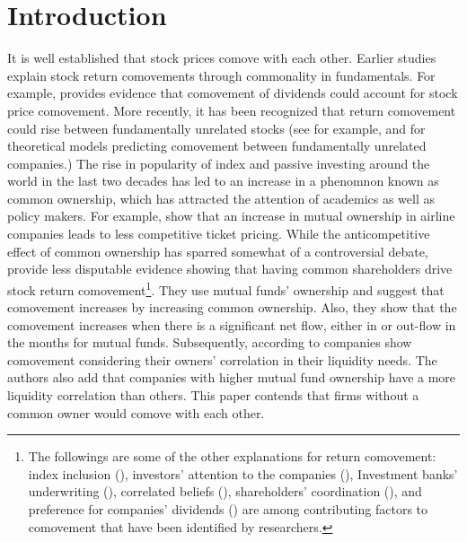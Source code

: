 \section{Introduction}

It is well established that stock prices comove with each other. Earlier studies explain stock return comovements through commonality in fundamentals. For example, \cite{shiller1989comovements} provides evidence that comovement of dividends could account for stock price comovement. More recently, it has been recognized that return comovement could rise between fundamentally unrelated stocks (see for example, {\cite{barberis2003style} and \cite{barberis2005comovement}} for theoretical models predicting comovement between fundamentally unrelated companies.) The rise in popularity of index and passive investing around the world in the last two decades has led to an increase in a phenomnon known as common ownership, which has attracted the attention of academics as well as policy makers. For example, \cite{azar2018anticompetitive} show that an increase in mutual ownership in airline companies leads to less competitive ticket pricing.  While the anticompetitive effect of common ownership has sparred somewhat of a controversial debate, {\cite{AntonPolk}} provide less disputable evidence showing that having common shareholders drive stock return comovement\footnote{
	The followings are some of the other explanations for return comovement: index inclusion ({\cite{barberis2005comovement}}), investors' attention to the companies ({\cite{wu2014investor}}), Investment banks' underwriting ({\cite{grullon2014comovement}}), correlated beliefs ({\cite{david2016correlated}}), shareholders' coordination ({\cite{pantzalis2017shareholder}}), and preference for companies' dividends ({\cite{HAMEED2019103}}) are among contributing factors to comovement that have been identified by researchers.
}.
 They use mutual funds' ownership and suggest that comovement increases by increasing common ownership. Also, they show that the comovement increases when there is a significant net flow, either in or out-flow in the months for mutual funds.
Subsequently, according to {\cite{Liquidity2016}} companies show comovement considering their owners' correlation in their liquidity needs. The authors also add that companies with higher mutual fund ownership have a more liquidity correlation than others. This paper contends that firms without a common owner would comove with each other. 
	
